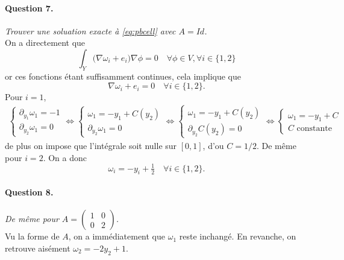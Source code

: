 \documentclass[11pt]{article}
\newcommand{\question}[2]{\paragraph{Question #1.}\textit{#2} \\}
\begin{document}
\question{7}{Trouver une soluation exacte à \autoref{eq:pbcell} avec $A=Id$.}
On a directement que
\begin{equation}
  \int_Y \big(\nabla \omega_i+e_i\big) \nabla \phi = 0 \quad \forall \phi \in V, \forall i \in \{1,2\}
\end{equation}
or ces fonctions étant suffisamment continues, cela implique que
\begin{equation}
  \nabla \omega_i+e_i = 0 \quad \forall i \in \{1,2\}.
\end{equation}
Pour $i=1$,
\begin{align}
  \begin{cases}
    \partial_{y_1} \omega_1 = -1 \\
    \partial_{y_2} \omega_1 = 0
  \end{cases} \iff
  \begin{cases}
    \omega_1 = - y_1 + C(y_2) \\
    \partial_{y_2} \omega_1 = 0 
  \end{cases} \iff
  \begin{cases}
    \omega_1 = - y_1 + C(y_2) \\
    \partial_{y_2} C(y_2) = 0 
  \end{cases} \iff
  \begin{cases}
    \omega_1 = - y_1 + C \\
    C \text{ constante}
  \end{cases}
\end{align}
de plus on impose que l'intégrale soit nulle sur $[0,1]$, d'ou $C=1/2$. De même pour $i=2$. On a donc
\begin{equation}
  \omega_i = - y_i + \tfrac{1}{2} \quad \forall i \in \{1,2\}.
\end{equation}

\question{8}{De même pour
$A = \left(\begin{matrix}
  1 & 0 \\
  0 & 2 
\end{matrix}\right)$.
}

Vu la forme de $A$, on a immédiatement que  $\omega_1$ reste inchangé. En revanche, on retrouve aisément $\omega_2 = -2 y_2 +1$.
\end{document}
